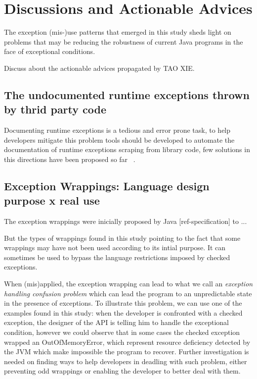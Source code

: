 \documentclass[conference]{IEEEtran}
\begin{document}
\section{Discussions and Actionable Advices}

The exception (mis-)use patterns that emerged  in this study sheds light on 
problems that may be reducing the robustness of current Java programs in the face of
exceptional conditions. 

Discuss about the actionable advices propagated by TAO XIE.


\subsection{The undocumented runtime exceptions thrown by thrid party code} 
Documenting runtime exceptions is a tedious and error prone task, to help developers
mitigate this problem tools should be developed to automate the documentation of runtime exceptions
scraping from library code, few solutions in this directions have been proposed so far ~\cite{van2005combining}. 

\subsection{Exception Wrappings: Language design purpose x real use}

The exception wrappings were inicially proposed by Java [ref-specification] to ...

But the types of wrappings found in this study pointing to the fact that some wrappings may have not 
been used according to its intial purpose. It can sometimes be used to bypass the  
language restrictions imposed by checked exceptions.

When (mis)applied, the exception wrapping can lead to what we call
an \emph{exception handling confusion problem} which can lead the program to
an unpredictable state in the presence of exceptions. To illustrate this problem, we can use
 one of the examples found in this study: when the developer is 
confronted with a checked exception, the designer of the API is telling him 
to handle the exceptional condition, however we could observe that in some cases the 
checked exception wrapped an OutOfMemoryError, which represent resource deficiency detected 
by the JVM which make impossible the program to recover. Further investigation is needed on finding 
ways to help developers in deadling with such problem, either preventing odd wrappings or enabling 
the developer to better deal with them. 
\end{document}
